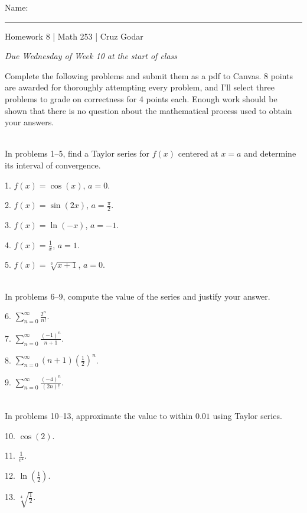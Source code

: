 \documentclass{article}
\begin{document}
\Large Name: \rule{2in}{0.15mm} \hfill Homework 8 | Math 253 | Cruz Godar \vspace{4pt}  \normalsize

\textit{Due Wednesday of Week 10 at the start of class}

Complete the following problems and submit them as a pdf to Canvas. 8 points are awarded for thoroughly attempting every problem, and I'll select three problems to grade on correctness for 4 points each. Enough work should be shown that there is no question about the mathematical process used to obtain your answers.

~\\

In problems 1--5, find a Taylor series for $f(x)$ centered at $x = a$ and determine its interval of convergence.

1. $\displaystyle f(x) = \cos(x)$, $\displaystyle a = 0$.

2. $\displaystyle f(x) = \sin(2x)$, $\displaystyle a = \frac{\pi}{2}$.

3. $\displaystyle f(x) = \ln(-x)$, $\displaystyle a = -1$.

4. $\displaystyle f(x) = \frac{1}{x}$, $\displaystyle a = 1$.

5. $\displaystyle f(x) = \sqrt[3]{x + 1}$, $\displaystyle a = 0$.

~\\

In problems 6--9, compute the value of the series and justify your answer.

6. $\displaystyle \sum_{n = 0}^\infty \frac{2^n}{n!}$.

7. $\displaystyle \sum_{n = 0}^\infty \frac{(-1)^n}{n + 1}$.

8. $\displaystyle \sum_{n = 0}^\infty (n + 1)\left( \frac{1}{2} \right)^n$.

9. $\displaystyle \sum_{n = 0}^\infty \frac{(-4)^n}{(2n)!}$.

~\\

In problems 10--13, approximate the value to within $0.01$ using Taylor series. 

10. $\displaystyle \cos(2)$.

11. $\displaystyle \frac{1}{e^2}$.

12. $\displaystyle \ln\left( \frac{1}{2} \right)$.

13. $\displaystyle \sqrt[4]{\frac{1}{2}}$.

~\\
\end{document}
